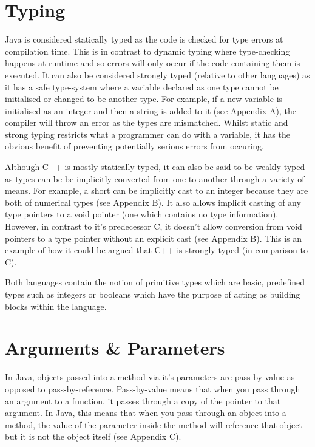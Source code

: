 \documentclass[]{report}
\begin{document}
\section{Typing}
Java is considered statically typed as the code is checked for type errors at compilation time. This is in contrast to dynamic typing where type-checking happens at runtime and so errors will only occur if the code containing them is executed. It can also be considered strongly typed (relative to other languages) as it has a safe type-system where a variable declared as one type cannot be initialised or changed to be another type. For example, if a new variable is initialised as an integer and then a string is added to it (see Appendix A), the compiler will throw an error as the types are mismatched. Whilst static and strong typing restricts what a programmer can do with a variable, it has the obvious benefit of preventing potentially serious errors from occuring. 	

Although C++ is mostly statically typed, it can also be said to be weakly typed as types can be be implicitly converted from one to another through a variety of means. For example, a short can be implicitly cast to an integer because they are both of numerical types (see Appendix B). It also allows implicit casting of any type pointers to a void pointer (one which contains no type information). However, in contrast to it's predecessor C, it doesn't allow conversion from void pointers to a type pointer without an explicit cast (see Appendix B). This is an example of how it could be argued that C++ is strongly typed (in comparison to C).

Both languages contain the notion of primitive types which are basic, predefined types such as integers or booleans which have the purpose of acting as building blocks within the language.

\section{Arguments \& Parameters}
In Java, objects passed into a method via it's parameters are pass-by-value as opposed to pass-by-reference. Pass-by-value means that when you pass through an argument to a function, it passes through a copy of the pointer to that argument. In Java, this means that when you pass through an object into a method, the value of the parameter inside the method will reference that object but it is not the object itself (see Appendix C). \cite{ParametersJava}
\end{document}
